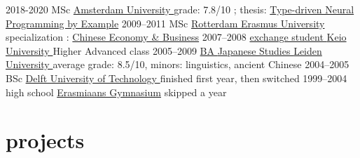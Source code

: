 \documentclass[]{friggeri-cv}
\begin{document}
\begin{entrylist}
  \entry
    {2018-2020}
    {MSc }
    {\href{http://www.uva.nl/}{
      Amsterdam University
    }}
    {
      grade: 7.8/10
      ; thesis: \href{https://arxiv.org/abs/2008.12613}{Type-driven Neural Programming by Example}
    }
  \entry
    {2009–2011}
    {MSc }
    {\href{https://www.rsm.nl/}{
      Rotterdam Erasmus University
    }}
    {
      specialization
      :
      \href{https://www.rsm.nl/about-rsm/organisation/expertise-search/chinese-economy/}{Chinese Economy \& Business}}
  \entry
    {2007–2008}
    {\href{https://www.cjs.keio.ac.jp/?page=24}{
      exchange student 
    }}
    {\href{https://www.keio.ac.jp/}{
      Keio University
    }}
    {
      Higher Advanced class
    }
  \entry
    {2005–2009}
    {\href{https://www.universiteitleiden.nl/onderwijs/opleidingen/bachelor/japanstudies}{BA \normalfont
    {
      Japanese Studies
    }}}
    {\href{https://www.universiteitleiden.nl/}{
      Leiden University
    }}
    {
      average grade: 8.5/10, minors: linguistics, ancient Chinese
    }
  \entry
    {2004–2005}
    {BSc \href{https://ocw.tudelft.nl/programs/bachelor/technische-informatica/}{}}
    {\href{https://www.tudelft.nl/}{
      Delft University of Technology
    }}
    {finished first year, then switched}
  \entry
    {1999–2004}
    {
      high school
      \href{https://nl.wikipedia.org/wiki/Profiel_natuur_en_techniek}{}}
    {\href{http://www.erasmiaans.nl/}{Erasmiaans Gymnasium}}
    {skipped a year}
\end{entrylist}

\newpage

\section{projects}
\end{document}
